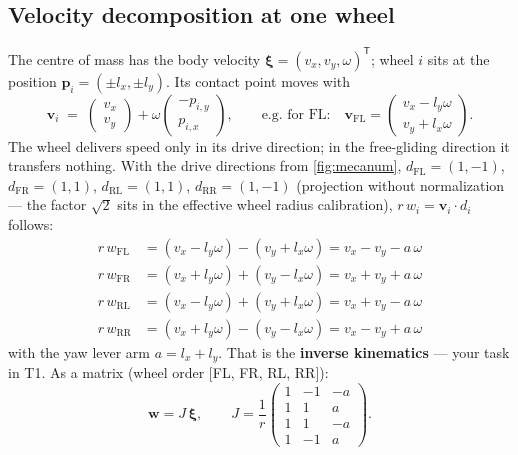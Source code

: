 \documentclass[12pt,a4paper]{scrartcl}
\begin{document}
\subsection{Velocity decomposition at one wheel}
The centre of mass has the body velocity \(\boldsymbol{\xi} =
(v_x, v_y, \omega)^{\mathsf T}\); wheel \(i\) sits at the position
\(\mathbf p_i = (\pm l_x, \pm l_y)\). Its contact point moves with
\begin{equation}
  \mathbf v_i \;=\; \begin{pmatrix} v_x \\ v_y\end{pmatrix}
  + \omega \begin{pmatrix} -p_{i,y} \\ p_{i,x}\end{pmatrix},
  \qquad\text{e.g.\ for FL:}\quad
  \mathbf v_\text{FL} = \begin{pmatrix} v_x - l_y\omega \\ v_y + l_x\omega\end{pmatrix}.
\end{equation}
The wheel delivers speed only in its drive direction; in the free-gliding direction it
transfers nothing. With the drive directions from \cref{fig:mecanum},
\(d_\text{FL} = (1,-1)\), \(d_\text{FR} = (1,1)\), \(d_\text{RL} = (1,1)\),
\(d_\text{RR} = (1,-1)\) (projection without normalization — the factor \(\sqrt2\) sits in
the effective wheel radius calibration), \(r\,w_i = \mathbf v_i \cdot d_i\) follows:
\begin{align}
  r\,w_\text{FL} &= (v_x - l_y\omega) - (v_y + l_x\omega) = v_x - v_y - a\,\omega
   \label{eq:fl}\\
  r\,w_\text{FR} &= (v_x + l_y\omega) + (v_y - l_x\omega) = v_x + v_y + a\,\omega
   \label{eq:fr}\\
  r\,w_\text{RL} &= (v_x - l_y\omega) + (v_y + l_x\omega) = v_x + v_y - a\,\omega
   \label{eq:rl}\\
  r\,w_\text{RR} &= (v_x + l_y\omega) - (v_y - l_x\omega) = v_x - v_y + a\,\omega
   \label{eq:rr}
\end{align}
with the yaw lever arm \(a = l_x + l_y\). That is the \textbf{inverse kinematics} — your
task in T1. As a matrix (wheel order \([\)FL, FR, RL, RR\(]\)):
\begin{equation}
  \mathbf w = J\,\boldsymbol{\xi},\qquad
  J = \frac{1}{r}\begin{pmatrix}
    1 & -1 & -a\\ 1 & 1 & a\\ 1 & 1 & -a\\ 1 & -1 & a
  \end{pmatrix}.
  \label{eq:J}
\end{equation}
\end{document}
